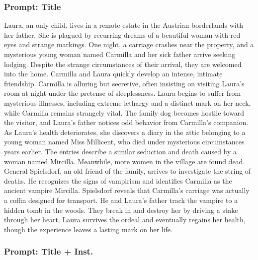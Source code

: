 \documentclass{article} %
\begin{document}
\subsubsection{Prompt: Title}

Laura, an only child, lives in a remote estate in the Austrian borderlands with her father. \textcolor{skipred}{She is plagued by recurring dreams of a beautiful woman with red eyes and strange markings. One night, a carriage crashes near the property, and a mysterious young woman named Carmilla and her sick father arrive seeking lodging.} Despite the strange circumstances of their arrival, they are welcomed into the home. Carmilla and Laura quickly develop an intense, intimate friendship. Carmilla is alluring but secretive, often insisting on visiting Laura's room at night under the pretense of sleeplessness. Laura begins to suffer from mysterious illnesses, including extreme lethargy and a distinct mark on her neck, while Carmilla remains strangely vital. \textcolor{skipred}{The family dog becomes hostile toward the visitor, and Laura's father notices odd behavior from Carmilla's companion. As Laura's health deteriorates, she discovers a diary in the attic belonging to a young woman named Miss Millicent, who died under mysterious circumstances years earlier. The entries describe a similar seduction and death caused by a woman named Mircilla. Meanwhile, more women in the village are found dead.} General Spielsdorf, an old friend of the family, arrives to investigate the string of deaths. He recognizes the signs of vampirism and identifies Carmilla as the ancient vampire Mircilla. \textcolor{skipred}{Spielsdorf reveals that Carmilla's carriage was actually a coffin designed for transport.} He and Laura's father track the vampire to a hidden tomb in the woods. They break in and destroy her by driving a stake through her heart. Laura survives the ordeal and eventually regains her health, though the experience leaves a lasting mark on her life.

\subsubsection{Prompt: Title + Inst.}
\end{document}
